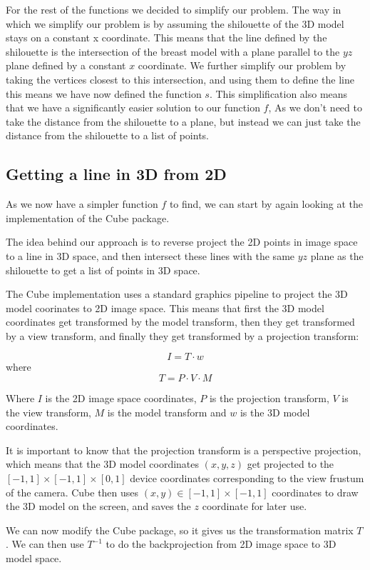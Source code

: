 For the rest of the functions we decided to simplify our problem. The way in which we simplify our problem is by assuming the shilouette of the 3D model stays on a constant x coordinate. This means
that the line defined by the shilouette is the intersection of the breast model with a plane parallel to the $yz$ plane defined by a constant $x$ coordinate. We further simplify our problem by 
taking the vertices closest to this intersection, and using them to define the line this means we have now defined the function $s$. This simplification also means that we have a significantly
easier solution to our function $f$, As we don't need to take the distance from the shilouette to a plane, but instead we can just take the distance from the shilouette to a list of points.

\subsection{Getting a line in 3D from 2D}

As we now have a simpler function $f$ to find, we can start by again looking at the implementation of the Cube package. 

The idea behind our approach is to reverse project the 2D points in image space to
a line in 3D space, and then intersect these lines with the same $yz$ plane as the shilouette to get a list of points in 3D space.

The Cube implementation uses a standard graphics pipeline to project the 3D model coorinates to 2D image space. This means that first the 3D model coordinates get transformed by the model transform, then
they get transformed by a view transform, and finally they get transformed by a projection transform:

\[
    I = T \cdot w
\]
where 
\[
    T = P \cdot V \cdot M
\]

Where $I$ is the 2D image space coordinates, $P$ is the projection transform, $V$ is the view transform, $M$ is the model transform and $w$ is the 3D model coordinates. 

It is important to know that the projection transform is a perspective projection, which means that the 3D model coordinates $(x,y,z)$ get projected to the $[-1,1] \times [-1,1] \times [0,1]$ device coordinates corresponding to the
view frustum of the camera. Cube then uses $(x,y) \in [-1,1] \times [-1,1]$ coordinates to draw the 3D model on the screen, and saves the $z$ coordinate for later use.

We can now modify the Cube package, so it gives us the transformation matrix $T$. We can then use $T^{-1}$ to do the backprojection from 2D image space to 3D model space.

